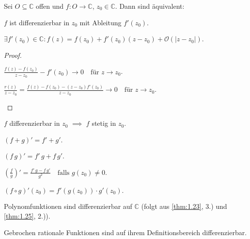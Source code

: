 \begin{theorem}[Satz]
  Sei $O \subseteq \mathbb{C}$ offen und $f : O \to \mathbb{C}$, $z_0 \in \mathbb{C}$. Dann sind äquivalent:
  \begin{enum-roman}
    \item $f$ ist differenzierbar in $z_0$ mit Ableitung $f'(z_0)$.
    
    \item $\exists f'(z_0) \in \mathbb{C} : f(z) = f(z_0) + f'(z_0) (z-z_0) + \mathcal{O}(|z-z_0|)$.
  \end{enum-roman}
  
  \begin{proof}
    \begin{enum-roman}
      \item $\displaystyle \frac{f(z) - f(z_0)}{z-z_0} - f'(z_0) \to 0 \quad \text{für } z \to z_0$.
      
      \item $\displaystyle \frac{r(z)}{z-z_0} = \frac{f(z) - f(z_0) - (z-z_0) f'(z_0)}{z-z_0} \to 0 \quad \text{für } z \to z_0$.
    \end{enum-roman}
  \end{proof}
\end{theorem}

\begin{theorem}[Satz] \label{thm:1.25}
  \begin{enum-arab}
    \item $f$ differenzierbar in $z_0$ $\implies$ $f$ stetig in $z_0$.
    
    \item $(f+g)' = f' + g'$.
    
    \item $(f \, g)' = f' \, g + f \, g'$.
    
    \item $\displaystyle \left( \frac{f}{g} \right)' = \frac{f' \, g - f \, g'}{g^2} \quad \text{falls } g(z_0) \neq 0$.
    
    \item $(f \circ g)'(z_0) = f'(g(z_0)) \cdot g'(z_0)$.
  \end{enum-arab}
\end{theorem}

\begin{example}
  \begin{enum-arab}
    \item Polynomfunktionen sind differenzierbar auf $\mathbb{C}$ (folgt aus \ref{thm:1.23}, 3.) und \ref{thm:1.25}, 2.)).
    
    \item Gebrochen rationale Funktionen sind auf ihrem Definitionsbereich differenzierbar.
  \end{enum-arab}
\end{example}

